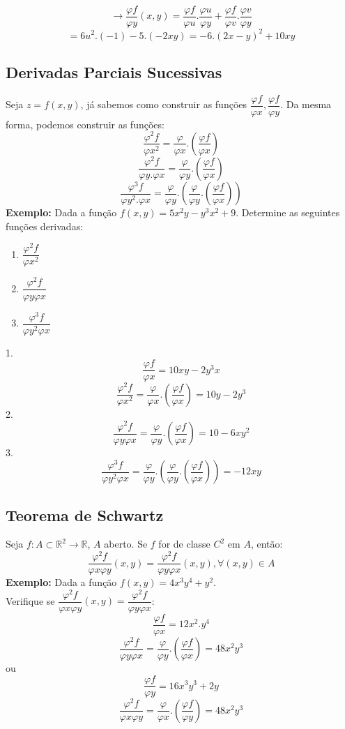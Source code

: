 \documentclass{article}
\begin{document}
		$$\to \dfrac{\varphi f}{\varphi y}(x,y)= \dfrac{\varphi f}{\varphi u}.\dfrac{\varphi u}{\varphi y}+ \dfrac{\varphi f}{\varphi v}.\dfrac{\varphi v}{\varphi y}$$
		$$= 6u^2.(-1)-5.(-2xy)= -6.(2x-y)^2+10xy$$
		
	\subsection{Derivadas Parciais Sucessivas}
		Seja $z=f(x,y)$, já sabemos como construir as funções $\dfrac{\varphi f}{\varphi x}, \dfrac{\varphi f}{\varphi y}$. Da mesma forma, podemos construir as funções:
		$$\dfrac{\varphi ^2 f}{\varphi x^2} = \dfrac{\varphi}{\varphi x}.(\dfrac{\varphi f}{\varphi x})$$
		$$\dfrac{\varphi^2f}{\varphi y . \varphi x}= \dfrac{\varphi}{\varphi y}.(\dfrac{\varphi f}{\varphi x})$$
		$$\dfrac{\varphi ^3f}{\varphi y^2.\varphi x} = \dfrac{\varphi}{\varphi y}.(\dfrac{\varphi}{\varphi y}.(\dfrac{\varphi f}{\varphi x}))$$
		\textbf{Exemplo:} Dada a função $f(x,y) = 5x^2y-y^3x^2+9$. Determine as seguintes funções derivadas:
		\begin{enumerate}
			\item $\dfrac{\varphi^2f}{\varphi x^2}$
			\item $\dfrac{\varphi ^2 f}{\varphi y \varphi x}$
			\item $\dfrac{\varphi ^3f}{\varphi y^2\varphi x}$
		\end{enumerate}
		1.
		$$\dfrac{\varphi f}{\varphi x} = 10xy-2y^3x$$
		$$\dfrac{\varphi ^2f}{\varphi x^2} = \dfrac{\varphi}{\varphi x}.(\dfrac{\varphi f}{\varphi x}) = 10y - 2y^3$$
		2.
		$$\dfrac{\varphi ^2f}{\varphi y \varphi x}=\dfrac{\varphi}{\varphi y}.(\dfrac{\varphi f}{\varphi x})=10-6xy^2$$
		3.
		$$\dfrac{\varphi ^3 f}{\varphi y^2 \varphi x}=\dfrac{\varphi}{\varphi y}.(\dfrac{\varphi}{\varphi y}.(\dfrac{\varphi f}{\varphi x})) = -12xy$$
		
		
	\subsection{Teorema de Schwartz}
		Seja $f:A \subset \mathbb{R}^2\to \mathbb{R}$, $A$ aberto. Se $f$ for de classe $C^2$ em $A$, então:
		$$\dfrac{\varphi ^2 f}{\varphi x \varphi y}(x,y) = \dfrac{\varphi ^2 f}{\varphi y \varphi x}(x,y), \forall (x,y) \in A$$
		\textbf{Exemplo:} Dada a função $f(x,y)= 4x^3y^4+y^2$.\\
		Verifique se $\dfrac{\varphi ^2 f}{\varphi x \varphi y}(x,y) = \dfrac{\varphi ^2 f}{\varphi y \varphi x}$:
		$$\dfrac{\varphi f}{\varphi x} = 12x^2.y^4$$
		$$\dfrac{\varphi ^2 f}{\varphi y \varphi x} =\dfrac{\varphi}{\varphi y} .(\dfrac{\varphi f}{\varphi x}) = 48 x^2y^3$$
		ou
		$$\dfrac{\varphi f}{\varphi y} = 16 x^3y^3+2y$$
		$$\dfrac{\varphi ^2 f}{\varphi x \varphi y} = \dfrac{\varphi}{\varphi x}.(\dfrac{\varphi f}{\varphi y}) = 48x^2y^3$$
\end{document}
